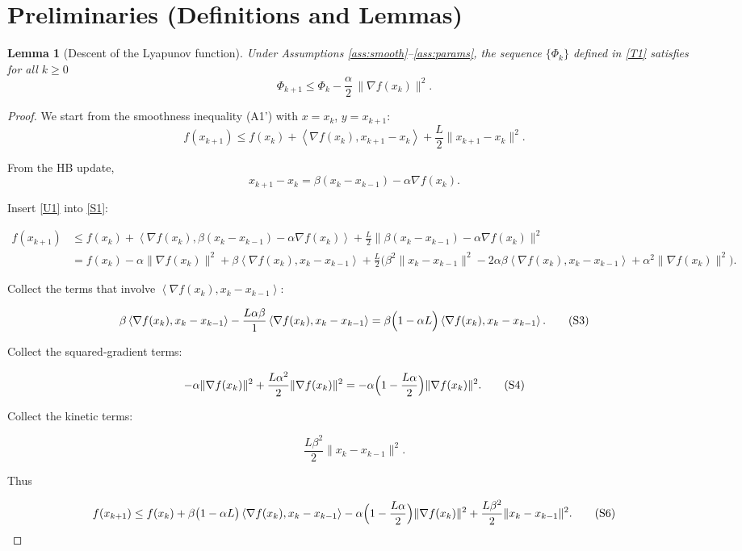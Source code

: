 \documentclass{article}
\newtheorem{lemma}{Lemma}
\newcommand{\inner}[2]{\left\langle #1,#2\right\rangle}
\begin{document}
\section*{Preliminaries (Definitions and Lemmas)}
\begin{lemma}[Descent of the Lyapunov function]\label{lem:descent}
Under Assumptions \ref{ass:smooth}–\ref{ass:params}, the sequence $\{\Phi_k\}$ defined in \eqref{T1} satisfies for all $k\ge0$
\[
\Phi_{k+1}\le \Phi_k-\frac{\alpha}{2}\,\|\nabla f(x_k)\|^2 .
\tag{L1}
\]
\end{lemma}
\begin{proof}
We start from the smoothness inequality (A1') with $x=x_k$, $y=x_{k+1}$:
\[
f(x_{k+1})\le f(x_k)+\inner{\nabla f(x_k)}{x_{k+1}-x_k}
+\frac{L}{2}\|x_{k+1}-x_k\|^2 .\tag{S1}
\]

From the HB update,
\[
x_{k+1}-x_k = \beta (x_k-x_{k-1})-\alpha\nabla f(x_k). \tag{U1}
\]

Insert \eqref{U1} into \eqref{S1}:

\[
\begin{aligned}
f(x_{k+1})
&\le f(x_k)+\inner{\nabla f(x_k)}{\beta (x_k-x_{k-1})-\alpha\nabla f(x_k)}
+\frac{L}{2}\|\beta (x_k-x_{k-1})-\alpha\nabla f(x_k)\|^2\\
&= f(x_k) -\alpha\|\nabla f(x_k)\|^2
+ \beta\inner{\nabla f(x_k)}{x_k-x_{k-1}}
+\frac{L}{2}\bigl(\beta^2\|x_k-x_{k-1}\|^2
-2\alpha\beta\inner{\nabla f(x_k)}{x_k-x_{k-1}}
+\alpha^2\|\nabla f(x_k)\|^2\bigr). \tag{S2}
\end{aligned}
\]

Collect the terms that involve $\inner{\nabla f(x_k)}{x_k-x_{k-1}}$:

\[
\beta\inner{\nabla f(x_k)}{x_k-x_{k-1}}
-\frac{L\alpha\beta}{1}\inner{\nabla f(x_k)}{x_k-x_{k-1}}
= \beta\Bigl(1-\alpha L\Bigr)\inner{\nabla f(x_k)}{x_k-x_{k-1}} .\tag{S3}
\]

Collect the squared‑gradient terms:

\[
-\alpha\|\nabla f(x_k)\|^2+\frac{L\alpha^{2}}{2}\|\nabla f(x_k)\|^2
= -\alpha\Bigl(1-\frac{L\alpha}{2}\Bigr)\|\nabla f(x_k)\|^2 .\tag{S4}
\]

Collect the kinetic terms:

\[
\frac{L\beta^{2}}{2}\|x_k-x_{k-1}\|^2 .\tag{S5}
\]

Thus

\[
f(x_{k+1})\le f(x_k)
+\beta\bigl(1-\alpha L\bigr)\inner{\nabla f(x_k)}{x_k-x_{k-1}}
-\alpha\Bigl(1-\frac{L\alpha}{2}\Bigr)\|\nabla f(x_k)\|^2
+\frac{L\beta^{2}}{2}\|x_k-x_{k-1}\|^2 .\tag{S6}
\]


\end{proof}
\end{document}
